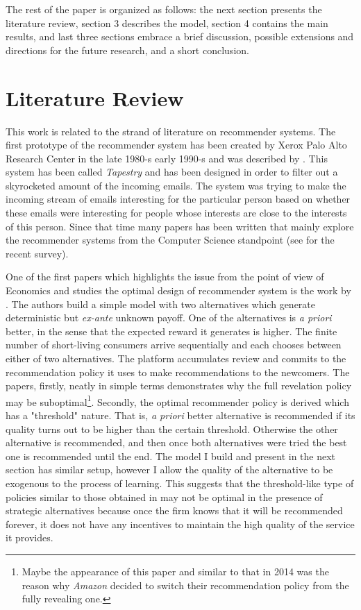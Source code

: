 \documentclass[a4paper]{article}
\begin{document}
	
	
	
	The rest of the paper is organized as follows: the next section presents the literature review, section 3 describes the model, section 4 contains the main results, and last three sections embrace a brief discussion, possible extensions and directions for the future research, and a short conclusion.
	\section{Literature Review}
	This work is related to the strand of literature on recommender systems. The first prototype of the recommender system has been created by Xerox Palo Alto Research Center in the late 1980-s early 1990-s and was described by  \cite{goldberg1992using}. This system has been called \textit{Tapestry} and has been designed in order to filter out a skyrocketed amount of the incoming emails. The system was trying to make the incoming stream of emails interesting for the particular person based on whether these emails were interesting for people whose interests are close to the interests of this person. Since that time many papers has been written that mainly explore the recommender systems from the Computer Science standpoint (see \cite{Beel2015r} for the recent survey). 
	
	
	
	
	
	One of the first papers which highlights the issue from the point of view of Economics and studies the optimal design of recommender system is the work by \cite{kremer2014}. The authors build a simple model with two alternatives which generate deterministic but \textit{ex-ante} unknown payoff. One of the alternatives is \textit{a priori} better, in the sense that the expected reward it generates is higher. The finite number of short-living consumers arrive sequentially and each chooses between either of two alternatives. The platform accumulates review and commits to the recommendation policy it uses to make recommendations to the newcomers. The papers, firstly, neatly in simple terms demonstrates why the full revelation policy may be suboptimal\footnote{Maybe the appearance of this paper and similar to that in 2014 was the reason why \textit{Amazon} decided to switch their recommendation policy from the fully revealing one.}. Secondly, the optimal recommender policy is derived which has a "threshold" nature. That is, \textit{a priori} better alternative is recommended if its quality turns out to be higher than the certain threshold. Otherwise the other alternative is recommended, and then once both alternatives were tried the best one is recommended until the end. The model I build and present in the next section has similar setup, however I allow the quality of the alternative to be exogenous to the process of learning. This suggests that the threshold-like type of policies similar to those obtained in \cite{kremer2014} may not be optimal in the presence of strategic alternatives because once the firm knows that it will be recommended forever, it does not have any incentives to maintain the high quality of the service it provides. 
	
\end{document}
